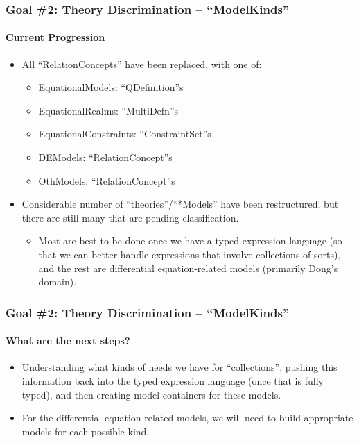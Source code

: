 \documentclass{beamer}
\begin{document}
\begin{frame}
    \frametitle{Goal \#2: Theory Discrimination -- ``ModelKinds''}
    \framesubtitle{Current Progression}
    
    \begin{itemize}
        \item<2-> All ``RelationConcepts'' have been replaced, with one of:
            \begin{itemize}
                \item<3-> EquationalModels: ``QDefinition''s
                \item<4-> EquationalRealms: ``MultiDefn''s
                \item<5-> EquationalConstraints: ``ConstraintSet''s
                \item<6-> DEModels: ``RelationConcept''s
                \item<7-> OthModels: ``RelationConcept''s
            \end{itemize}
        \item<8-> Considerable number of ``theories''/``*Models'' have been restructured, but there are still many that are pending classification.
            \begin{itemize}
                \item<9-> Most are best to be done once we have a typed expression language (so that we can better handle expressions that involve collections of sorts), and the rest are differential equation-related models (primarily Dong's domain).
            \end{itemize}
    \end{itemize}
\end{frame}

\begin{frame}
    \frametitle{Goal \#2: Theory Discrimination -- ``ModelKinds''}
    \framesubtitle{What are the next steps?}
    
    \begin{itemize}
        \item<2-> Understanding what kinds of needs we have for ``collections'', pushing this information back into the typed expression language (once that is fully typed), and then creating model containers for these models.
        \item<3-> For the differential equation-related models, we will need to build appropriate models for each possible kind.
    \end{itemize}
\end{frame}
\end{document}
